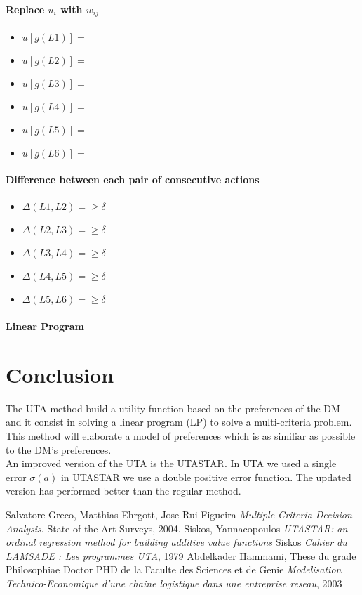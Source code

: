 \documentclass{report}
\begin{document}
\subsubsection{Replace $u_i$ with $w_{ij} $}
\begin{itemize}
\item $u[g(L1)]= $
\item $u[g(L2)]= $
\item $u[g(L3)]= $
\item $u[g(L4)]= $
\item $u[g(L5)]= $
\item $u[g(L6)]= $
\end{itemize}

\subsubsection{Difference between each pair of consecutive actions}
\begin{itemize}
\item $\Delta (L1, L2) =  \geq \delta$
\item $\Delta (L2, L3) = \geq \delta$
\item $\Delta (L3, L4) = \geq \delta$
\item $\Delta (L4, L5) = \geq \delta$
\item $\Delta (L5, L6) = \geq \delta$
\end{itemize}

\subsubsection{Linear Program}


\chapter{Conclusion}
The UTA method build a utility function based on the preferences of the DM and it consist in solving a linear program (LP) to solve a multi-criteria problem.\\

This method will elaborate a model of preferences which is as similiar as possible to the DM's preferences.\\

An improved version of the UTA is the UTASTAR. In UTA we used a single error $\sigma(a)$ in UTASTAR we use a double positive error function. The updated version has performed better than the regular method. 

\begin{thebibliography}{9}
 Salvatore Greco, Matthias Ehrgott, Jose Rui Figueira \textit{Multiple Criteria Decision Analysis}. State of the Art Surveys, 2004.
 Siskos, Yannacopoulos \textit{UTASTAR: an ordinal regression method for building additive value functions}
 Siskos \textit{Cahier du LAMSADE : Les programmes UTA}, 1979
 Abdelkader Hammami, These du grade Philosophiae Doctor PHD de la Faculte des Sciences et de Genie \textit{Modelisation Technico-Economique d'une chaine logistique dans une entreprise reseau}, 2003
\end{thebibliography}
\end{document}
